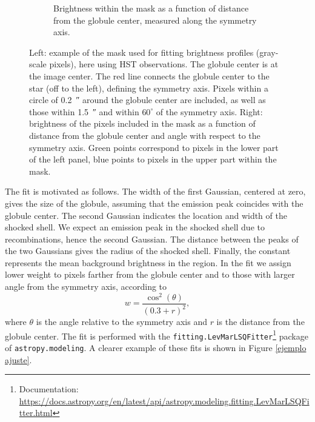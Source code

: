 \documentclass{book}
\begin{document}
\begin{figure}[htb]
\begin{subfigure}[b]{0.5\textwidth}
    \caption{Brightness within the mask as a function of distance from
      the globule center, measured along the symmetry axis.}
    \label{fig:f2}
  \end{subfigure}
  \caption{Left: example of the mask used for fitting brightness
    profiles (gray-scale pixels), here using HST observations. The
    globule center is at the image center. The red line connects the
    globule center to the star (off to the left), defining the
    symmetry axis. Pixels within a circle of \SI{0.2}{\arcsecond}
    around the globule center are included, as well as those within
    \SI{1.5}{\arcsecond} and within $60^\circ$ of the symmetry axis.
    Right: brightness of the pixels included in the mask as a function
    of distance from the globule center and angle with respect to the
    symmetry axis. Green points correspond to pixels in the lower part
    of the left panel, blue points to pixels in the upper part within
    the mask.}
  \label{ejemplo mascara}
\end{figure}

The fit is motivated as follows. The width of the first Gaussian,
centered at zero, gives the size of the globule, assuming that the
emission peak coincides with the globule center. The second Gaussian
indicates the location and width of the shocked shell. We expect an
emission peak in the shocked shell due to recombinations, hence the
second Gaussian. The distance between the peaks of the two Gaussians
gives the radius of the shocked shell. Finally, the constant
represents the mean background brightness in the region. In the fit we
assign lower weight to pixels farther from the globule center and to
those with larger angle from the symmetry axis, according to
\begin{equation}\label{eq: peso}
    w = \frac{\cos^2(\theta)}{(0.3+r)^2},
\end{equation}
where $\theta$ is the angle relative to the symmetry axis and $r$ is
the distance from the globule center. The fit is performed with the
\verb|fitting.LevMarLSQFitter|\footnote{Documentation:
  \url{https://docs.astropy.org/en/latest/api/astropy.modeling.fitting.LevMarLSQFitter.html}}
package of \verb|astropy.modeling|. A clearer example of these fits is
shown in Figure \ref{ejemplo ajuste}.
\end{document}
